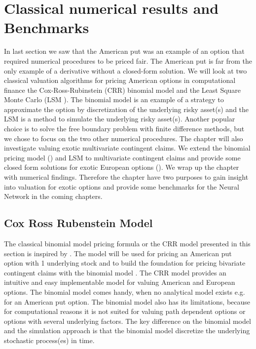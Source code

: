 \chapter{Classical numerical results and Benchmarks} %

\label{Chapter3} %

In last section we saw that the American put was an example of an option that required numerical procedures to be priced fair. The American put is far from the only example of a derivative without a closed-form solution. We will look at two classical valuation algorithms for pricing American options in computational finance the Cox-Ross-Rubinstein (CRR) binomial model \parencite{CRR} and the Least Square Monte Carlo (LSM \parencite{LSM}). The binomial model is an example of a strategy to approximate the option by discretization of the underlying risky asset(s) and the LSM is a method to simulate the underlying risky asset(s). Another popular choice is to solve the free boundary problem with finite difference methods, but we chose to focus on the two other numerical procedures. The chapter will also investigate valuing exotic multivariate contingent claims. We extend the binomial pricing model (\parencite{NEK,BEG}) and LSM to multivariate contingent claims and provide some closed form solutions for exotic European options (\parencite{Johnson87, Ouwehand2006}). We wrap up the chapter with numerical findings. Therefore the chapter have two purposes to gain insight into valuation for exotic options and provide some benchmarks for the Neural Network in the coming chapters.

\section{Cox Ross Rubenstein Model}\label{CRR}
The classical binomial model pricing formula or the CRR model presented in this section is inspired by \parencite{CRR,Hull,finKont}. The model will be used for pricing an American put option with 1 underlying stock and to build the foundation for pricing bivariate contingent claims with the binomial model \parencite{BEG}. The CRR model provides an intuitive and easy implementable model for valuing American and European options. The binomial model comes handy, when no analytical model exists e.g. for an American put option. The binomial model also has its limitations, because for computational reasons it is not suited for valuing path dependent options or options with several underlying factors. The key difference on the binomial model and the simulation approach is that the binomial model discretize the underlying stochastic process(es) in time. \\

